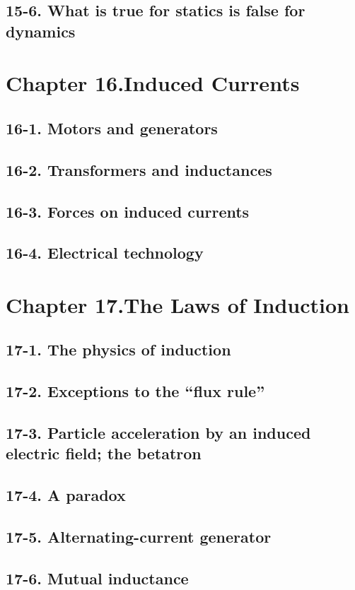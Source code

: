 \documentclass{article}
\begin{document}
\subsection{15-6. What is true for statics is false for dynamics}
\section{Chapter 16.Induced Currents}
\subsection{16-1. Motors and generators}
\subsection{16-2. Transformers and inductances}
\subsection{16-3. Forces on induced currents}
\subsection{16-4. Electrical technology}
\section{Chapter 17.The Laws of Induction}
\subsection{17-1. The physics of induction}
\subsection{17-2. Exceptions to the “flux rule”}
\subsection{17-3. Particle acceleration by an induced electric field; the betatron}
\subsection{17-4. A paradox}
\subsection{17-5. Alternating-current generator}
\subsection{17-6. Mutual inductance}
\end{document}
